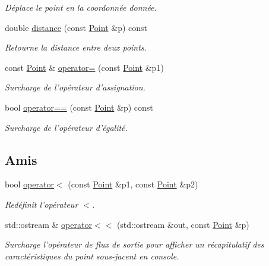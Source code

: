 \begin{DoxyCompactItemize}
\begin{DoxyCompactList}\small\item\em Déplace le point en la coordonnée donnée. \end{DoxyCompactList}\item 
double \hyperlink{classPoint_a61651e744a578356e2296e7935e858d7}{distance} (const \hyperlink{classPoint}{Point} \&p) const 
\begin{DoxyCompactList}\small\item\em Retourne la distance entre deux points. \end{DoxyCompactList}\item 
const \hyperlink{classPoint}{Point} \& \hyperlink{classPoint_a1436b60e581a48190621810f2a4d29cb}{operator=} (const \hyperlink{classPoint}{Point} \&p1)
\begin{DoxyCompactList}\small\item\em Surcharge de l'opérateur d'assignation. \end{DoxyCompactList}\item 
bool \hyperlink{classPoint_a2a6b68cd301437368de443687fc2a9f1}{operator==} (const \hyperlink{classPoint}{Point} \&p) const 
\begin{DoxyCompactList}\small\item\em Surcharge de l'opérateur d'égalité. \end{DoxyCompactList}\end{DoxyCompactItemize}
\subsection*{Amis}
\begin{DoxyCompactItemize}
\item 
bool \hyperlink{classPoint_aea03821811d00d0a252f7d845b3cf4a5}{operator$<$} (const \hyperlink{classPoint}{Point} \&p1, const \hyperlink{classPoint}{Point} \&p2)
\begin{DoxyCompactList}\small\item\em Redéfinit l'opérateur $<$. \end{DoxyCompactList}\item 
std\+::ostream \& \hyperlink{classPoint_aa818efa680e0d94ce91173ccb4b7aa08}{operator$<$$<$} (std\+::ostream \&out, const \hyperlink{classPoint}{Point} \&p)
\begin{DoxyCompactList}\small\item\em Surcharge l'opérateur de flux de sortie pour afficher un récapitulatif des caractéristiques du point sous-\/jacent en console. \end{DoxyCompactList}\end{DoxyCompactItemize}


